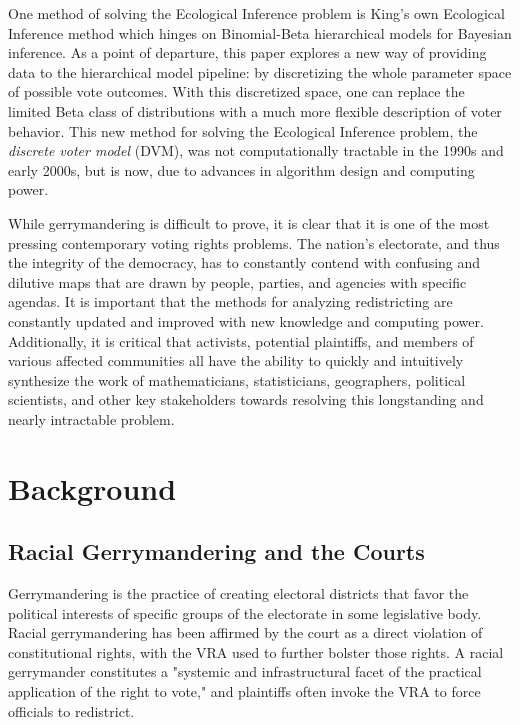 \documentclass[fleqn,10pt]{style}
\begin{document}
One method of solving the Ecological Inference problem is King's own Ecological Inference method which hinges on Binomial-Beta hierarchical models for Bayesian inference. As a point of departure, this paper explores a new way of providing data to the hierarchical model pipeline: by discretizing the whole parameter space of possible vote outcomes. With this discretized space, one can replace the limited Beta class of distributions with a much more flexible description of voter behavior. This new method for solving the Ecological Inference problem, the \textit{discrete voter model} (DVM), was not computationally tractable in the 1990s and early 2000s, but is now, due to advances in algorithm design and computing power.

While gerrymandering is difficult to prove, it is clear that it is one of the most pressing contemporary voting rights problems. The nation’s electorate, and thus the integrity of the democracy, has to constantly contend with confusing and dilutive maps that are drawn by people, parties, and agencies with specific agendas. It is important that the methods for analyzing redistricting are constantly updated and improved with new knowledge and computing power. Additionally, it is critical that activists, potential plaintiffs, and members of various affected communities all have the ability to quickly and intuitively synthesize the work of mathematicians, statisticians, geographers, political scientists, and other key stakeholders towards resolving this longstanding and nearly intractable problem.


\newpage
\section{Background}

\subsection{Racial Gerrymandering and the Courts}

Gerrymandering is the practice of creating electoral districts that favor the political interests of specific groups of the electorate in some legislative body. Racial gerrymandering has been affirmed by the court as a direct violation of constitutional rights, with the VRA used to further bolster those rights. A racial gerrymander constitutes a "systemic and infrastructural facet of the practical application of the right to vote," and plaintiffs often invoke the VRA to force officials to redistrict.
\end{document}
